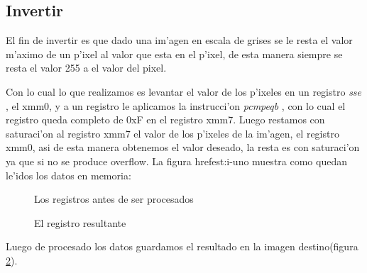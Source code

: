 \subsection{Invertir}
El fin de invertir es que dado una im'agen en escala de grises se le resta el valor m'aximo de un p'ixel al valor que esta en el p'ixel, de esta manera siempre se resta el valor 255 a el valor del pixel.

Con lo cual lo que realizamos es levantar el valor de los p'ixeles en un registro \textit{sse} , el xmm0, y a un registro le aplicamos la instrucci'on \textit{pcmpeqb} , con lo cual el registro queda completo de 0xF en el registro xmm7.
Luego restamos con saturaci'on al registro xmm7 el valor de los p'ixeles de la im'agen, el registro xmm0, asi de esta manera obtenemos el valor deseado, la resta es con saturaci'on ya que si no se produce overflow.
La figura href{est:i-uno} muestra como quedan le'idos los datos en memoria:

\begin{figure}[ht]


\caption{Los registros antes de ser procesados}
\label{est:i-uno}
\end{figure}

\begin{figure}[ht]
\caption{El registro resultante}
\label{est:i-dos}
\end{figure}

Luego de procesado los datos guardamos el resultado en la imagen destino(figura \ref{est:i-dos}).

